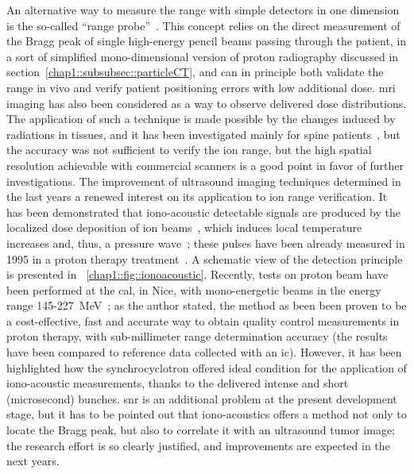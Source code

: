 An alternative way to measure the range with simple detectors in one dimension is the so-called \enquote{range probe}~\parencite{Mumot2010, Watts2009}. This concept relies on the direct measurement of the Bragg peak of single high-energy pencil beams passing through the patient, in a sort of simplified mono-dimensional version of proton radiography discussed in section~\ref{chap1::subsubsec::particleCT}, and can in principle both validate the range in vivo and verify patient positioning errors with low additional dose.        
\gls{mri} imaging has also been considered as a way to observe delivered dose distributions. The application of such a technique is made possible by the changes induced by radiations in tissues, and it has been investigated mainly for spine patients~\parencite{Gensheimer2010}, but the accuracy was not sufficient to verify the ion range, but the high spatial resolution achievable with commercial scanners is a good point in favor of further investigations. 
The improvement of ultrasound imaging techniques  determined in the last years a renewed interest on its application to ion range verification. It has been demonstrated that iono-acoustic detectable signals are produced by the localized dose deposition of ion beams~\parencite{Tada1991}, which induces local temperature increases and, thus, a pressure wave~\parencite{Parodi2015b}; these pulses have been already measured in 1995 in a proton therapy treatment~\parencite{Hayakawa1995}.  A schematic view of the detection principle is presented in \figurename~\ref{chap1::fig::ionoacoustic}. Recently, tests on proton beam have been performed at the \gls{cal}, in Nice, with mono-energetic beams in the energy range 145-227~MeV~\parencite{Lehrack2017}; as the author stated, the method as been been proven to be a cost-effective, fast and accurate way to obtain quality control measurements in proton therapy, with sub-millimeter range determination accuracy (the results have been compared to reference data collected with an \gls{ic}). However, it has been highlighted how the synchrocyclotron offered ideal condition for the application of iono-acoustic measurements, thanks to the delivered intense and short (microsecond) bunches. \gls{snr} is an additional problem at the present development stage, but it has to be pointed out that iono-acoustics offers a method not only to locate the Bragg peak, but also to correlate it with an ultrasound tumor image; the research effort is so clearly justified, and improvements are expected in the next years.
